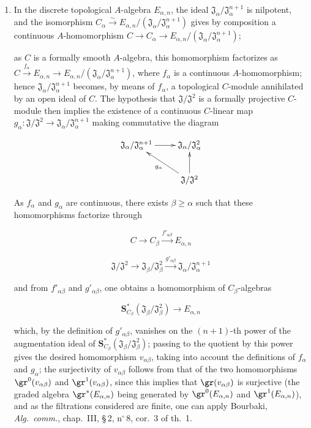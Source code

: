 \begin{env}[19.5.6.4]
\label{0.19.5.6.4}
\begin{enumerate}
  \item[\rm(i)] In the discrete topological $A$-algebra $E_{\alpha,n}$, the ideal $\mathfrak{J}_\alpha/\mathfrak{J}_\alpha^{n+1}$ is nilpotent, and the isomorphism $C_\alpha\xrightarrow{\sim}E_{\alpha,n}/(\mathfrak{J}_\alpha/\mathfrak{J}_\alpha^{n+1})$ gives by composition a continuous $A$-homomorphism $C\to C_\alpha\to E_{\alpha,n}/(\mathfrak{J}_\alpha/\mathfrak{J}_\alpha^{n+1})$;


  as $C$ is a formally smooth $A$-algebra, this homomorphism factorizes as $C\xrightarrow{f_\alpha}E_{\alpha,n}\to E_{\alpha,n}/(\mathfrak{J}_\alpha/\mathfrak{J}_\alpha^{n+1})$,
  where $f_\alpha$ is a continuous $A$-homomorphism;
  hence $\mathfrak{J}_\alpha/\mathfrak{J}_\alpha^{n+1}$ becomes, by means of $f_\alpha$, a topological $C$-module annihilated by an open ideal of $C$.
  The hypothesis that $\mathfrak{J}/\mathfrak{J}^2$ is a formally projective $C$-module then implies the existence of a continuous $C$-linear map $g_\alpha:\mathfrak{J}/\mathfrak{J}^2\to\mathfrak{J}_\alpha/\mathfrak{J}_\alpha^{n+1}$ making commutative the diagram
  
\[
\xymatrix{
      \mathfrak{J}_\alpha/\mathfrak{J}_\alpha^{n+1} \ar[r] & \mathfrak{J}_\alpha/\mathfrak{J}_\alpha^2 \\
      & \mathfrak{J}/\mathfrak{J}^2 \ar[ul]^{g_\alpha} \ar[u]
    }
\]


  As $f_\alpha$ and $g_\alpha$ are continuous, there exists $\beta\geq\alpha$ such that these homomorphisms factorize through
  
\[
C\to C_\beta\xrightarrow{f'_{\alpha\beta}}E_{\alpha,n}
\]

  
\[
\mathfrak{J}/\mathfrak{J}^2\to\mathfrak{J}_\beta/\mathfrak{J}_\beta^2\xrightarrow{g'_{\alpha\beta}}\mathfrak{J}_\alpha/\mathfrak{J}_\alpha^{n+1}
\]

  and from $f'_{\alpha\beta}$ and $g'_{\alpha\beta}$, one obtains a homomorphism of $C_\beta$-algebras
  
\[
\mathbf{S}_{C_\beta}^*(\mathfrak{J}_\beta/\mathfrak{J}_\beta^2) \to E_{\alpha,n}
\]

  which, by the definition of $g'_{\alpha\beta}$, vanishes on the $(n+1)$-th power of the augmentation ideal of $\mathbf{S}_{C_\beta}^*(\mathfrak{J}_\beta/\mathfrak{J}_\beta^2)$; passing to the quotient by this power gives the desired homomorphism $v_{\alpha\beta}$, taking into account the definitions of $f_\alpha$ and $g_\alpha$;
  the surjectivity of $v_{\alpha\beta}$ follows from that of the two homomorphisms $\gr^0(v_{\alpha\beta})$ and $\gr^1(v_{\alpha\beta})$,
  since this implies that $\gr(v_{\alpha\beta})$ is surjective (the graded algebra $\gr^*(E_{\alpha,n})$ being generated by $\gr^0(E_{\alpha,n})$ and $\gr^1(E_{\alpha,n})$), and
  as the filtrations considered are finite, one can apply Bourbaki, \emph{Alg.\ comm.}, chap.~III, \S\,2, n$^\circ$\,8, cor.~3 of th.~1.


\end{enumerate}
\end{env}

